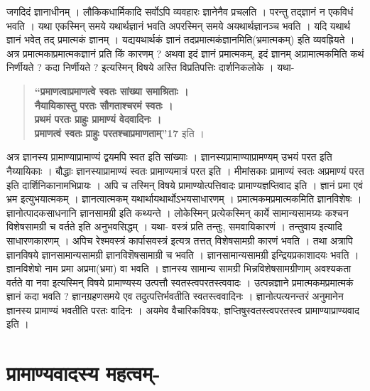 {जगदिदं ज्ञानाधीनम् । लौकिकधार्मिकादि सर्वोऽपि व्यवहारः ज्ञानेनैव प्रचलति । परन्तु तद्ज्ञानं न एकविधं भवति । यथा एकस्मिन् समये यथार्थज्ञानं भवति अपरस्मिन् समये अयथार्थज्ञानञ्च भवति । यदि यथार्थ ज्ञानं भवेत् तद् प्रमात्मकं ज्ञानम् । यद्ययथार्थकं ज्ञानं तदप्रमात्मकंज्ञानमिति(भ्रमात्मकम्) इति व्यवह्रियते । अत्र प्रमात्मकाप्रमात्मकज्ञानं प्रति किं कारणम् ? अथवा इदं ज्ञानं प्रमात्मकम्, इदं ज्ञानम् अप्रामात्मकमिति कथं निर्णीयते ? कदा निर्णीयते ? इत्यस्मिन् विषये अस्ति विप्रतिपत्तिः दार्शनिकलोके । यथा-
\begin{verse}
\textbf{“प्रमाणत्वाप्रमाणत्वे स्वतः सांख्या समाश्रिताः ।\\
नैयायिकास्तु परतः सौगताश्चरमं स्वतः ।\\
प्रथमं परतः प्राहुः प्रामाण्यं वेदवादिनः ।\\
प्रमाणत्वं स्वतः प्राहुः परतश्चाप्रमाणताम्”17} इति ।
\end{verse}
अत्र ज्ञानस्य प्रामाण्याप्रामाण्यं द्वयमपि स्वत इति सांख्याः । ज्ञानस्यप्रामाण्याप्रामण्यम् उभयं परत इति नैय्यायिकाः । बौद्धाः ज्ञानस्याप्रामाण्यं स्वतः प्रामाण्यमात्रं परत इति । मीमांसकाः प्रामाण्यं स्वतः अप्रमाण्यं परत इति दार्शिनिकानामभिप्रायः । अपि च तस्मिन् विषये प्रामाण्योत्पत्तिवादः प्रामाण्यज्ञप्तिवाद इति । ज्ञानं प्रमा एवं भ्रम इत्युभयात्मकम् । ज्ञानत्वात्मकम् यथार्थायथार्थोऽभयसाधारणम् । प्रमात्मकमप्रमात्मकमिति ज्ञानविशेषः । ज्ञानोत्पादकसाधनानि ज्ञानसामग्री इति कथ्यन्ते । लोकेस्मिन् प्रत्येकस्मिन् कार्ये सामान्यसामग्र्यः कश्चन विशेषसामग्री च वर्तते इति अनुभवसिद्धम् । यथा- वस्त्रं प्रति तन्तुः, समवायिकारणं । तन्तुवाय इत्यादि साधारणकारणम् । अपिच रेश्मवस्त्रं कार्पासवस्त्रं इत्यत्र तत्तत् विशेषसामग्री कारणं भवति । तथा अत्रापि ज्ञानविषये ज्ञानसामान्यसामग्री ज्ञानविशॆषसामाग्री च भवति । ज्ञानसामान्यसामग्री इन्द्रियप्रकाशादयः भवति । ज्ञानविशेषो नाम प्रमा अप्रमा(भ्रमा) वा भवति । ज्ञानस्य सामान्य सामग्री भिन्नविशेषसामग्रीणाम् अवश्यकता वर्तते वा नवा इत्यस्मिन् विषये प्रामाण्यस्य उत्पत्तौ स्वतस्त्वपरतस्त्ववादः । उत्पन्नज्ञाने प्रमात्मकमप्रमात्मकं ज्ञानं कदा भवति ? ज्ञानग्रहणसमये एव तदुत्पत्तिर्भवतीति स्वतस्त्ववादिनः । ज्ञानोत्पत्यनन्तरं अनुमानेन ज्ञानस्य प्रामाण्यं भवतीति परतः वादिनः । अयमेव वैचारिकविषयः, ज्ञप्तिषुस्वतस्त्वपरतस्त्व प्रामाण्याप्राण्यवाद इति ।

\section*{प्रामाण्यवादस्य महत्वम्-}

}

